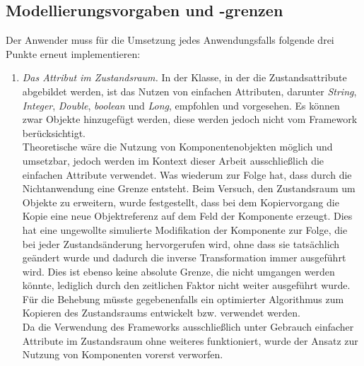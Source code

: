     \subsection{Modellierungsvorgaben und -grenzen}
    \label{subsec:modellierungsgrenzen}
        Der Anwender muss für die Umsetzung jedes Anwendungsfalls folgende drei Punkte erneut implementieren: 
        \begin{enumerate}
            \item \textit{Das Attribut im Zustandsraum.}
            In der Klasse, in der die Zustandsattribute abgebildet werden, ist das Nutzen von einfachen Attributen, darunter 
            \textit{String}, \textit{Integer}, \textit{Double}, \textit{boolean} und \textit{Long}, empfohlen und vorgesehen. Es können 
            zwar Objekte hinzugefügt werden, diese werden jedoch nicht vom Framework berücksichtigt. 
            \\
            Theoretische wäre die Nutzung von Komponentenobjekten möglich und umsetzbar, jedoch werden im Kontext dieser Arbeit ausschließlich die einfachen Attribute verwendet. Was wiederum zur Folge hat, dass 
            durch die Nichtanwendung eine Grenze entsteht. Beim Versuch, den Zustandsraum um Objekte zu erweitern, wurde festgestellt, dass bei dem Kopiervorgang die Kopie eine neue Objektreferenz 
            auf dem Feld der Komponente erzeugt. Dies hat eine ungewollte simulierte Modifikation der Komponente zur Folge, die bei jeder Zustandsänderung hervorgerufen wird, ohne dass sie tatsächlich geändert wurde und 
            dadurch die inverse Transformation immer ausgeführt wird. 
            Dies ist ebenso keine absolute Grenze, die nicht umgangen werden könnte, lediglich durch den zeitlichen Faktor nicht weiter ausgeführt wurde. Für die Behebung müsste gegebenenfalls ein optimierter 
            Algorithmus zum Kopieren des Zustandsraums entwickelt bzw. verwendet werden. 
            \\
            Da die Verwendung des Frameworks ausschließlich unter Gebrauch einfacher Attribute im Zustandsraum ohne weiteres funktioniert, wurde der Ansatz zur Nutzung von Komponenten vorerst verworfen.  
            

\end{enumerate}
